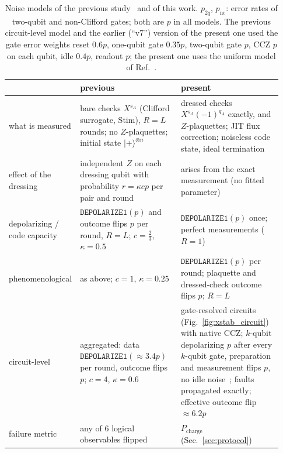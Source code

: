 \documentclass[a4paper]{article}
\providecommand{\ket}[1]{\ensuremath{|#1\rangle}}
\begin{document}
\begin{table}[t]
\centering
\caption{Noise models of the previous study~\cite{haga2026aqis} and of this work. $p_{2q}$, $p_{\mathrm{nc}}$: error rates of two-qubit and non-Clifford gates; both are $p$ in all models. The previous circuit-level model and the earlier (``v7'') version of the present one used the gate error weights reset $0.6p$, one-qubit gate $0.35p$, two-qubit gate $p$, CCZ $p$ on each qubit, idle $0.4p$, readout $p$; the present one uses the uniform model of Ref.~\cite{takada2026exact}.}
\label{tab:noise}
\small
\renewcommand{\arraystretch}{1.15}
\begin{tabular}{p{0.15\linewidth}p{0.39\linewidth}p{0.39\linewidth}}
\toprule
 & previous~\cite{haga2026aqis} & present \\
\midrule
what is measured & bare checks $X^{s_A}$ (Clifford surrogate, Stim), $R=L$ rounds; no $Z$-plaquettes; initial state $\ket{+}^{\otimes n}$ & dressed checks $X^{s_A}(-1)^{q_A}$ exactly, and $Z$-plaquettes; JIT flux correction; noiseless code state, ideal termination \\
effect of the dressing & independent $Z$ on each dressing qubit with probability $r=\kappa cp$ per pair and round & arises from the exact measurement (no fitted parameter) \\
\midrule
depolarizing / code capacity & $\mathtt{DEPOLARIZE1}(p)$ and outcome flips $p$ per round, $R=L$; $c=\tfrac23$, $\kappa=0.5$ & $\mathtt{DEPOLARIZE1}(p)$ once; perfect measurements ($R=1$) \\
phenomenological & as above; $c=1$, $\kappa=0.25$ & $\mathtt{DEPOLARIZE1}(p)$ per round; plaquette and dressed-check outcome flips $p$; $R=L$ \\
circuit-level & aggregated: data $\mathtt{DEPOLARIZE1}(\approx3.4p)$ per round, outcome flips $p$; $c=4$, $\kappa=0.6$ & gate-resolved circuits (Fig.~\ref{fig:xstab_circuit}) with native CCZ; $k$-qubit depolarizing $p$ after every $k$-qubit gate, preparation and measurement flips $p$, no idle noise~\cite{takada2026exact}; faults propagated exactly; effective outcome flip $\approx6.2p$ \\
\midrule
failure metric & any of 6 logical observables flipped & $P_{\mathrm{charge}}$ (Sec.~\ref{sec:protocol}) \\
\bottomrule
\end{tabular}
\end{table}
\end{document}
